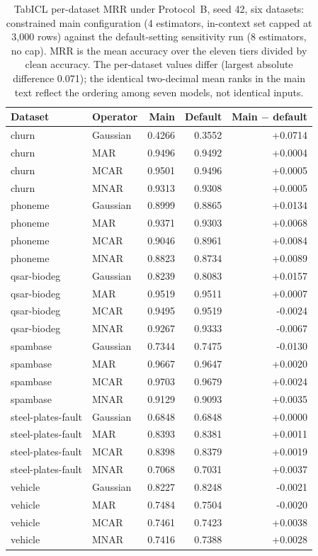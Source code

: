 \documentclass[pdflatex,sn-mathphys]{sn-jnl}
\theoremstyle{thmstyleone}
\begin{document}
\begin{table}[t]
\centering
\footnotesize
\caption{TabICL per-dataset MRR under Protocol~B, seed 42, six datasets: constrained main configuration (4 estimators, in-context set capped at 3{,}000 rows) against the default-setting sensitivity run (8 estimators, no cap). MRR is the mean accuracy over the eleven tiers divided by clean accuracy. The per-dataset values differ (largest absolute difference 0.071); the identical two-decimal mean ranks in the main text reflect the ordering among seven models, not identical inputs.}
\label{tab:tabicl_pd}
\begin{tabular}{@{}llrrr@{}}
\toprule
Dataset & Operator & Main & Default & Main $-$ default \\
\midrule
churn & Gaussian & 0.4266 & 0.3552 & +0.0714 \\
churn & MAR & 0.9496 & 0.9492 & +0.0004 \\
churn & MCAR & 0.9501 & 0.9496 & +0.0005 \\
churn & MNAR & 0.9313 & 0.9308 & +0.0005 \\
phoneme & Gaussian & 0.8999 & 0.8865 & +0.0134 \\
phoneme & MAR & 0.9371 & 0.9303 & +0.0068 \\
phoneme & MCAR & 0.9046 & 0.8961 & +0.0084 \\
phoneme & MNAR & 0.8823 & 0.8734 & +0.0089 \\
qsar-biodeg & Gaussian & 0.8239 & 0.8083 & +0.0157 \\
qsar-biodeg & MAR & 0.9519 & 0.9511 & +0.0007 \\
qsar-biodeg & MCAR & 0.9495 & 0.9519 & -0.0024 \\
qsar-biodeg & MNAR & 0.9267 & 0.9333 & -0.0067 \\
spambase & Gaussian & 0.7344 & 0.7475 & -0.0130 \\
spambase & MAR & 0.9667 & 0.9647 & +0.0020 \\
spambase & MCAR & 0.9703 & 0.9679 & +0.0024 \\
spambase & MNAR & 0.9129 & 0.9093 & +0.0035 \\
steel-plates-fault & Gaussian & 0.6848 & 0.6848 & +0.0000 \\
steel-plates-fault & MAR & 0.8393 & 0.8381 & +0.0011 \\
steel-plates-fault & MCAR & 0.8398 & 0.8379 & +0.0019 \\
steel-plates-fault & MNAR & 0.7068 & 0.7031 & +0.0037 \\
vehicle & Gaussian & 0.8227 & 0.8248 & -0.0021 \\
vehicle & MAR & 0.7484 & 0.7504 & -0.0020 \\
vehicle & MCAR & 0.7461 & 0.7423 & +0.0038 \\
vehicle & MNAR & 0.7416 & 0.7388 & +0.0028 \\
\bottomrule
\end{tabular}
\end{table}
\end{document}

